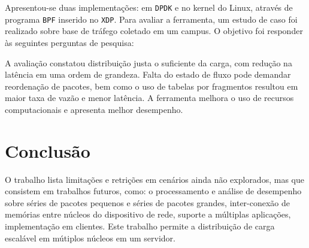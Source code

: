 Apresentou-se duas implementações: em \texttt{DPDK} e no kernel do Linux, 
através de programa \texttt{BPF} inserido no \texttt{XDP}. Para avaliar a 
ferramenta, um estudo de caso foi realizado sobre base de tráfego coletado em 
um campus. O objetivo foi responder às seguintes perguntas de pesquisa:

A avaliação constatou distribuição justa o suficiente da carga, com redução na 
latência em uma ordem de grandeza. Falta do estado de fluxo pode demandar 
reordenação de pacotes, bem como o uso de tabelas por fragmentos resultou em 
maior taxa de vazão e menor latência. A ferramenta melhora o uso de recursos 
computacionais e apresenta melhor desempenho.


\section*{Conclusão}

O trabalho lista limitações e retrições em cenários ainda não explorados, mas 
que consistem em trabalhos futuros, como: o processamento e análise de 
desempenho sobre séries de pacotes pequenos e séries de pacotes grandes, 
inter-conexão de memórias entre núcleos do dispositivo de rede, suporte a 
múltiplas aplicações, implementação em clientes. Este trabalho permite a 
distribuição de carga escalável em mútiplos núcleos em um servidor.
